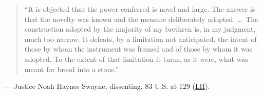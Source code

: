 \documentclass[12pt]{article}
\begin{document}
\begin{quote}
``It is objected that the power conferred is novel and large. The answer is that the novelty was known and the measure deliberately adopted. \ldots\ The construction adopted by the majority of my brethren is, in my judgment, much too narrow. It defeats, by a limitation not anticipated, the intent of those by whom the instrument was framed and of those by whom it was adopted. To the extent of that limitation it turns, as it were, what was meant for bread into a stone.''
\end{quote}
\noindent --- Justice Noah Haynes Swayne, dissenting, 83 U.S. at 129 (\href{https://www.law.cornell.edu/supremecourt/text/83/36}{LII}).
\end{document}

